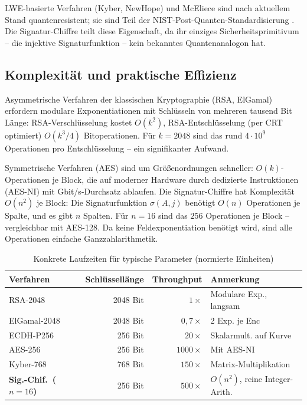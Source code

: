 ﻿\documentclass[a4paper,12pt]{scrreprt}
\theoremstyle{definition}
\begin{document}
LWE-basierte Verfahren (Kyber, NewHope) und McEliece sind nach aktuellem Stand quantenresistent; sie sind Teil der NIST-Post-Quanten-Standardisierung \cite{NIST22}. Die Signatur-Chiffre teilt diese Eigenschaft, da ihr einziges Sicherheitsprimitivum -- die injektive Signaturfunktion -- kein bekanntes Quantenanalogon hat.

\subsection{Komplexität und praktische Effizienz}

Asymmetrische Verfahren der klassischen Kryptographie (RSA, ElGamal) erfordern modulare Exponentiationen mit Schlüsseln von mehreren tausend Bit Länge: RSA-Verschlüsselung kostet $O(k^2)$, RSA-Entschlüsselung (per CRT optimiert) $O(k^3/4)$ Bitoperationen. Für $k=2048$ sind das rund $4\cdot10^9$ Operationen pro Entschlüsselung -- ein signifikanter Aufwand.

Symmetrische Verfahren (AES) sind um Größenordnungen schneller: $O(k)$-Operationen je Block, die auf moderner Hardware durch dedizierte Instruktionen (AES-NI) mit Gbit/s-Durchsatz ablaufen. Die Signatur-Chiffre hat Komplexität $O(n^2)$ je Block: Die Signaturfunktion $\sigma(A,j)$ benötigt $O(n)$ Operationen je Spalte, und es gibt $n$ Spalten. Für $n=16$ sind das $256$ Operationen je Block -- vergleichbar mit AES-128. Da keine Feldexponentiation benötigt wird, sind alle Operationen einfache Ganzzahlarithmetik.

\begin{table}[H]
\centering
\caption{Konkrete Laufzeiten für typische Parameter (normierte Einheiten)}
\label{tab:laufzeit}
\begin{tabular}{@{}lrrl@{}}
\toprule
\textbf{Verfahren} & \textbf{Schlüssellänge} & \textbf{Throughput} & \textbf{Anmerkung} \\
\midrule
RSA-2048              & 2048 Bit  & $1\times$      & Modulare Exp., langsam \\
ElGamal-2048          & 2048 Bit  & $0{,}7\times$  & 2 Exp. je Enc \\
ECDH-P256             & 256 Bit   & $20\times$     & Skalarmult. auf Kurve \\
AES-256               & 256 Bit   & $1000\times$   & Mit AES-NI \\
Kyber-768             & 768 Bit   & $150\times$    & Matrix-Multiplikation \\
\textbf{Sig.-Chif.\ ($n=16$)} & 256 Bit & $500\times$ & $O(n^2)$, reine Integer-Arith. \\
\bottomrule
\end{tabular}
\end{table}
\end{document}
